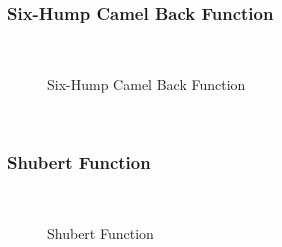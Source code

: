 \subsubsection{Six-Hump Camel Back Function}
~
\begin{figure}[ht]
	\centering
	\setlength \fboxsep{0pt}
	\setlength \fboxrule{0.5pt}
	\caption{Six-Hump Camel Back Function}
	\label{fig:CamelGraph}
\end{figure}
~
\subsubsection{Shubert Function}
~
\begin{figure}[ht]
	\centering
	\setlength \fboxsep{0pt}
	\setlength \fboxrule{0.5pt}
	\caption{Shubert Function}
	\label{fig:ShubertGraph}
\end{figure}
~
